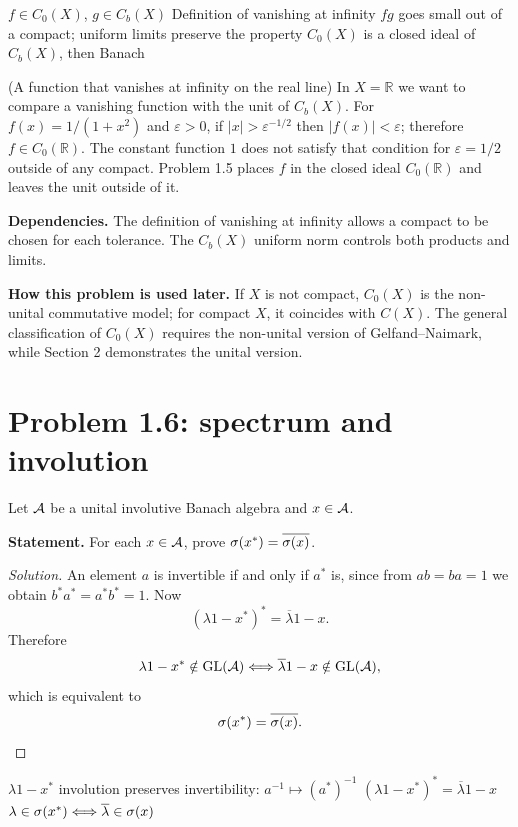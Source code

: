 \proofdiagram
{$f\in C_0(X)$, $g\in C_b(X)$}
{Definition of vanishing at infinity}
{$fg$ goes small out of a compact; uniform limits preserve the property}
{$C_0(X)$ is a closed ideal of $C_b(X)$, then Banach}

\begin{cthejemplo}{(A function that vanishes at infinity on the real line)}
In $X=\mathbb R$ we want to compare a vanishing function with the unit of $C_b(X)$.
For $f(x)=1/(1+x^2)$ and $\varepsilon>0$, if $|x|>\varepsilon^{-1/2}$ then
$|f(x)|<\varepsilon$; therefore $f\in C_0(\mathbb R)$.
The constant function $1$ does not satisfy that condition for $\varepsilon=1/2$ outside of any
compact. Problem 1.5 places $f$ in the closed ideal $C_0(\mathbb R)$ and leaves the unit outside of it.
\end{cthejemplo}

\noindent\textbf{Dependencies.} The definition of vanishing at infinity allows a compact to be chosen for each tolerance. The $C_b(X)$ uniform norm controls both products and limits.

\noindent\textbf{How this problem is used later.} If $X$ is not compact, $C_0(X)$ is the non-unital commutative model; for compact $X$, it coincides with $C(X)$. The general classification of $C_0(X)$ requires the non-unital version of Gelfand--Naimark, while Section 2 demonstrates the unital version.

\section{Problem 1.6: spectrum and involution}

Let $\mathcal A$ be a unital involutive Banach algebra and $x\in\mathcal A$.

\noindent\textbf{Statement.} For each $x\in\mathcal A$, prove $\sigma(x^*)=\overline{\sigma(x)}$.

\begin{proof}[Solution]
An element $a$ is invertible if and only if $a^*$ is, since from $ab=ba=1$ we obtain
$b^*a^*=a^*b^*=1$. Now
\[
(\lambda1-x^*)^*=\overline\lambda1-x.
\]
Therefore
\[
\lambda1-x^*\notin\operatorname{GL}(\mathcal A)
\Longleftrightarrow
\overline\lambda1-x\notin\operatorname{GL}(\mathcal A),
\]
which is equivalent to
\[
 \sigma(x^*)=\overline{\sigma(x)}.
\]
\end{proof}

\proofdiagram
{$\lambda1-x^*$}
{involution preserves invertibility: $a^{-1}\mapsto(a^*)^{-1}$}
{$(\lambda1-x^*)^*=\overline\lambda1-x$}
{$\lambda\in\sigma(x^*)\Longleftrightarrow\overline\lambda\in\sigma(x)$}

